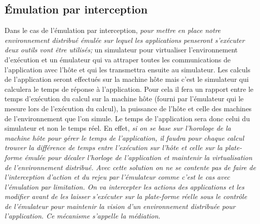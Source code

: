 \subsection{Émulation par interception}

Dans le cas de l'émulation par interception, \textit{pour mettre en place notre
  environnement distribué émulée sur lequel les applications penseront
  s'exécuter deux outils vont être utilisés;} un simulateur pour virtualiser
l'environnement d'exécution et un émulateur qui va attraper toutes les
communications de l'application avec l'hôte et qui les transmettra ensuite au
simulateur. Les calculs de l'application seront effectués sur la machine hôte
mais c'est le simulateur qui calculera le temps de réponse à l'application. Pour
cela il fera un rapport entre le temps d'exécution du calcul sur la machine hôte
(fourni par l'émulateur qui le mesure lors de l'exécution du calcul), la
puissance de l'hôte et celle des machines de l'environnement que l'on simule. Le
temps de l'application sera donc celui du simulateur et non le temps réel. En
effet, \textit{si on se base sur l'horologe de la machine hôte pour gérer le
  temps de l'application, il faudra pour chaque calcul trouver la différence de
  temps entre l'exécution sur l'hôte et celle sur la plate-forme émulée pour
  décaler l'horloge de l'application et maintenir la virtualisation de
  l'environnement distribué. Avec cette solution on ne se contente pas de faire
  de l'interception d'action et du rejeu par l'émulateur comme c'est le cas avec
  l'émulation par limitation. On va intercepter les actions des applications et
  les modifier avant de les laisser s'exécuter sur la plate-forme réelle sous le
  contrôle de l'émulateur pour maintenir la vision d'un environnement distribuée
  pour l'application. Ce mécanisme s'appelle la médiation.}

